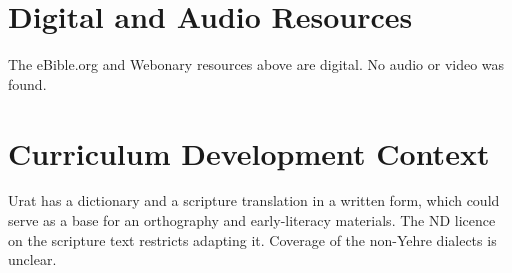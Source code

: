 \documentclass[12pt]{article}
\begin{document}
\section{Digital and Audio Resources}
The eBible.org and Webonary resources above are digital. No audio or video was found.

\section{Curriculum Development Context}
Urat has a dictionary and a scripture translation in a written form, which could serve as a base for an orthography and early-literacy materials. The ND licence on the scripture text restricts adapting it. Coverage of the non-Yehre dialects is unclear.
\end{document}
